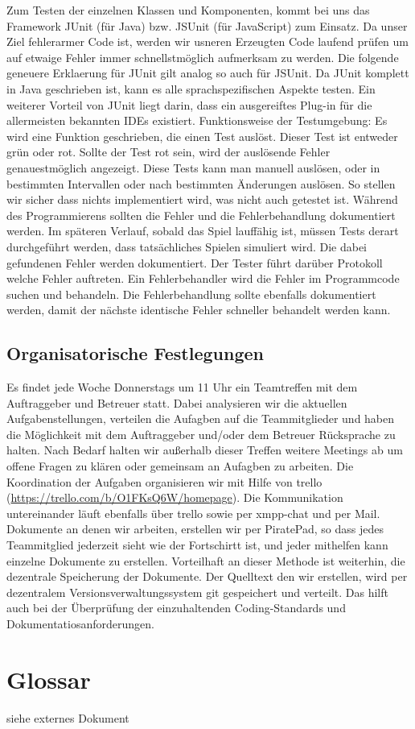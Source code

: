 \documentclass[11pt,a4paper]{article}
\begin{document}
Zum Testen der einzelnen Klassen und Komponenten, kommt bei uns das Framework JUnit (für Java) bzw. JSUnit (für JavaScript) zum Einsatz. Da unser Ziel fehlerarmer Code ist, werden wir usneren Erzeugten Code laufend prüfen um auf etwaige Fehler immer schnellstmöglich aufmerksam zu werden. 
Die folgende geneuere Erklaerung für JUnit gilt analog so auch für JSUnit.
Da JUnit komplett in Java geschrieben ist, kann es alle sprachspezifischen Aspekte testen. Ein weiterer Vorteil von JUnit liegt darin, dass ein ausgereiftes Plug-in für die allermeisten bekannten IDEs existiert. Funktionsweise der Testumgebung: Es wird eine Funktion geschrieben, die einen Test auslöst. Dieser Test ist entweder grün oder rot. Sollte der Test rot sein, wird der auslösende Fehler genauestmöglich angezeigt. Diese Tests kann man manuell auslösen, oder in bestimmten Intervallen oder nach bestimmten Änderungen auslösen. So stellen wir sicher dass nichts implementiert wird, was nicht auch getestet ist. Während des Programmierens sollten die Fehler und die Fehlerbehandlung dokumentiert werden.
Im späteren Verlauf, sobald das Spiel lauffähig ist, müssen Tests derart durchgeführt werden, dass tatsächliches Spielen simuliert wird. Die dabei gefundenen Fehler werden dokumentiert. Der Tester führt darüber Protokoll welche Fehler auftreten. Ein Fehlerbehandler wird die Fehler im Programmcode suchen und behandeln. Die Fehlerbehandlung sollte ebenfalls dokumentiert werden, damit der nächste identische Fehler schneller behandelt werden kann. 

\subsection{Organisatorische Festlegungen}

Es findet jede Woche Donnerstags um 11 Uhr ein Teamtreffen mit dem Auftraggeber und Betreuer statt. Dabei analysieren wir die aktuellen Aufgabenstellungen, verteilen die Aufagben auf die Teammitglieder und haben die Möglichkeit mit dem Auftraggeber und/oder dem Betreuer Rücksprache zu halten. Nach Bedarf halten wir außerhalb dieser Treffen weitere Meetings ab um offene Fragen zu klären oder gemeinsam an Aufagben zu arbeiten. Die Koordination der Aufgaben organisieren wir mit Hilfe von trello (\url{https://trello.com/b/O1FKsQ6W/homepage}). Die Kommunikation untereinander läuft ebenfalls über trello sowie per xmpp-chat und per Mail. Dokumente an denen wir arbeiten, erstellen wir per PiratePad, so dass jedes Teammitglied jederzeit sieht wie der Fortschirtt ist, und jeder mithelfen kann einzelne Dokumente zu erstellen. Vorteilhaft an dieser Methode ist weiterhin, die dezentrale Speicherung der Dokumente. Der Quelltext den wir erstellen, wird per dezentralem Versionsverwaltungssystem git gespeichert und verteilt. Das hilft auch bei der Überprüfung der einzuhaltenden Coding-Standards und Dokumentatiosanforderungen.

\section{Glossar}
siehe externes Dokument
\end{document}
